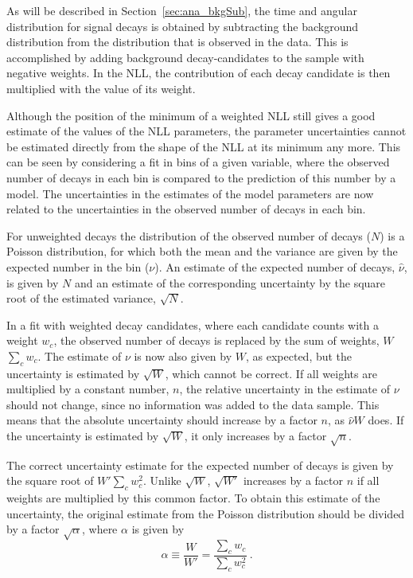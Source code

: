 As will be described in Section~\ref{sec:ana_bkgSub}, the time and angular distribution for \BstoJpsiKK{} signal decays is obtained by
subtracting the background distribution from the distribution that is observed in the data. This is accomplished by adding background
decay-candidates to the sample with negative weights. In the NLL, the contribution of each decay candidate is then multiplied with the
value of its weight.

Although the position of the minimum of a weighted NLL still gives a good estimate of the values of the NLL parameters, the parameter
uncertainties cannot be estimated directly from the shape of the NLL at its minimum any more. This can be seen by considering a fit in bins
of a given variable, where the observed number of decays in each bin is compared to the prediction of this number by a model. The
uncertainties in the estimates of the model parameters are now related to the uncertainties in the observed number of decays in each bin.

For unweighted decays the distribution of the observed number of decays ($N$) is a Poisson distribution, for which both the mean and the
variance are given by the expected number in the bin ($\nu$). An estimate of the expected number of decays, $\hat{\nu}$, is given by $N$
and an estimate of the corresponding uncertainty by the square root of the estimated variance, $\sqrt{N}$.

In a fit with weighted decay candidates, where each candidate counts with a weight $w_c$, the observed number of decays is replaced by the
sum of weights, $W$\textequiv$\sum_c w_c$. The estimate of $\nu$ is now also given by $W$, as expected, but the uncertainty is estimated by
$\sqrt{W}$, which cannot be correct. If all weights are multiplied by a constant number, $n$, the relative uncertainty in the estimate of
$\nu$ should not change, since no information was added to the data sample. This means that the absolute uncertainty should increase by a
factor $n$, as $\hat{\nu}$\texteq$W$ does. If the uncertainty is estimated by $\sqrt{W}$, it only increases by a factor $\sqrt{n}$.

The correct uncertainty estimate for the expected number of decays is given by the square root of $W'$\textequiv$\sum_c w_c^2$. Unlike
$\sqrt{W}$, $\sqrt{W'}$ increases by a factor $n$ if all weights are multiplied by this common factor. To obtain this estimate of the
uncertainty, the original estimate from the Poisson distribution should be divided by a factor $\sqrt{\alpha}$, where $\alpha$ is given by
\begin{equation}
  \alpha \equiv \frac{W}{W'} = \frac{\sum_c w_c}{\sum_c w_c^2} \ .
\end{equation}

